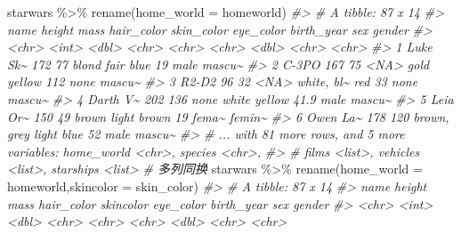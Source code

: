 \documentclass[
]{book}
\newenvironment{Shaded}{\begin{snugshade}}{\end{snugshade}}
\newcommand{\AttributeTok}[1]{\textcolor[rgb]{0.77,0.63,0.00}{#1}}
\newcommand{\CommentTok}[1]{\textcolor[rgb]{0.56,0.35,0.01}{\textit{#1}}}
\newcommand{\FunctionTok}[1]{\textcolor[rgb]{0.00,0.00,0.00}{#1}}
\newcommand{\NormalTok}[1]{#1}
\newcommand{\SpecialCharTok}[1]{\textcolor[rgb]{0.00,0.00,0.00}{#1}}
\begin{document}
\begin{Shaded}
\begin{Highlighting}[]
\NormalTok{starwars }\SpecialCharTok{\%\textgreater{}\%} \FunctionTok{rename}\NormalTok{(}\AttributeTok{home\_world =}\NormalTok{ homeworld)}
\CommentTok{\#\textgreater{} \# A tibble: 87 x 14}
\CommentTok{\#\textgreater{}   name     height  mass hair\_color  skin\_color eye\_color birth\_year sex   gender}
\CommentTok{\#\textgreater{}   \textless{}chr\textgreater{}     \textless{}int\textgreater{} \textless{}dbl\textgreater{} \textless{}chr\textgreater{}       \textless{}chr\textgreater{}      \textless{}chr\textgreater{}          \textless{}dbl\textgreater{} \textless{}chr\textgreater{} \textless{}chr\textgreater{} }
\CommentTok{\#\textgreater{} 1 Luke Sk\textasciitilde{}    172    77 blond       fair       blue            19   male  mascu\textasciitilde{}}
\CommentTok{\#\textgreater{} 2 C{-}3PO       167    75 \textless{}NA\textgreater{}        gold       yellow         112   none  mascu\textasciitilde{}}
\CommentTok{\#\textgreater{} 3 R2{-}D2        96    32 \textless{}NA\textgreater{}        white, bl\textasciitilde{} red             33   none  mascu\textasciitilde{}}
\CommentTok{\#\textgreater{} 4 Darth V\textasciitilde{}    202   136 none        white      yellow          41.9 male  mascu\textasciitilde{}}
\CommentTok{\#\textgreater{} 5 Leia Or\textasciitilde{}    150    49 brown       light      brown           19   fema\textasciitilde{} femin\textasciitilde{}}
\CommentTok{\#\textgreater{} 6 Owen La\textasciitilde{}    178   120 brown, grey light      blue            52   male  mascu\textasciitilde{}}
\CommentTok{\#\textgreater{} \# ... with 81 more rows, and 5 more variables: home\_world \textless{}chr\textgreater{}, species \textless{}chr\textgreater{},}
\CommentTok{\#\textgreater{} \#   films \textless{}list\textgreater{}, vehicles \textless{}list\textgreater{}, starships \textless{}list\textgreater{}}
\CommentTok{\# 多列同换}
\NormalTok{starwars }\SpecialCharTok{\%\textgreater{}\%} \FunctionTok{rename}\NormalTok{(}\AttributeTok{home\_world =}\NormalTok{ homeworld,}\AttributeTok{skincolor =}\NormalTok{ skin\_color)}
\CommentTok{\#\textgreater{} \# A tibble: 87 x 14}
\CommentTok{\#\textgreater{}   name     height  mass hair\_color  skincolor  eye\_color birth\_year sex   gender}
\CommentTok{\#\textgreater{}   \textless{}chr\textgreater{}     \textless{}int\textgreater{} \textless{}dbl\textgreater{} \textless{}chr\textgreater{}       \textless{}chr\textgreater{}      \textless{}chr\textgreater{}          \textless{}dbl\textgreater{} \textless{}chr\textgreater{} \textless{}chr\textgreater{} }

\end{Highlighting}
\end{Shaded}
\end{document}
